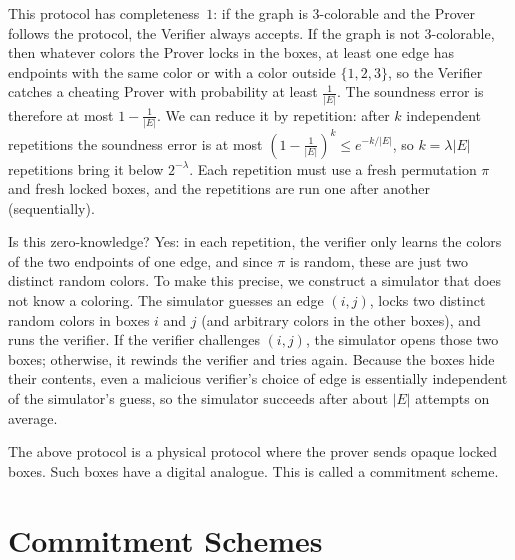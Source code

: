   This protocol has completeness~$1$: if the graph is 3-colorable and the Prover follows the protocol, the Verifier always accepts.
If the graph is not 3-colorable, then whatever colors the Prover locks in the boxes, at least one edge has endpoints with the same color or with a color outside $\{1,2,3\}$, so the Verifier catches a cheating Prover with probability at least $\frac{1}{|E|}$.
The soundness error is therefore at most $1-\frac{1}{|E|}$.
We can reduce it by repetition: after $k$ independent repetitions the soundness error is at most $(1-\frac{1}{|E|})^k \le e^{-k/|E|}$, so $k=\lambda|E|$ repetitions bring it below $2^{-\lambda}$.
Each repetition must use a fresh permutation $\pi$ and fresh locked boxes, and the repetitions are run one after another (sequentially).

Is this zero-knowledge?  Yes: in each repetition, the verifier only learns the colors of the two endpoints of one edge, and since $\pi$ is random, these are just two distinct random colors.
To make this precise, we construct a simulator that does not know a coloring.
The simulator guesses an edge $(i,j)$, locks two distinct random colors in boxes $i$ and $j$ (and arbitrary colors in the other boxes), and runs the verifier.
If the verifier challenges $(i,j)$, the simulator opens those two boxes; otherwise, it rewinds the verifier and tries again.
Because the boxes hide their contents, even a malicious verifier's choice of edge is essentially independent of the simulator's guess, so the simulator succeeds after about $|E|$ attempts on average. 

\begin{remark}
    The above protocol is a physical protocol where the prover sends opaque locked boxes.  Such boxes have a digital analogue.  This is called a commitment scheme.  
\end{remark}

\section{Commitment Schemes}
\providecommand{\Com}{\mathsf{Com}}
\providecommand{\PPT}{\text{p.p.t.}}
\providecommand{\secp}{\lambda}

